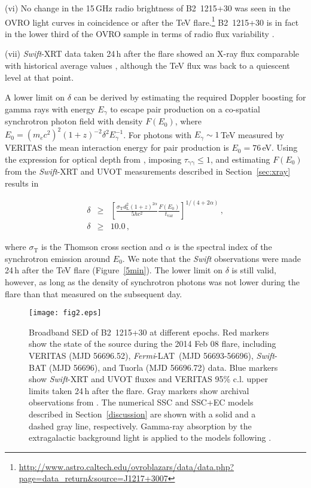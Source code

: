 \documentclass[twocolumn]{aastex6}
\def\b2{B2~1215+30}
\def\lat{\textit{Fermi}-LAT}
\begin{document}
(vi) No change in the 15\,GHz radio brightness of \b2 was seen in the OVRO light curves in coincidence or after the TeV flare.\footnote{ \url{http://www.astro.caltech.edu/ovroblazars/data/data.php?page=data\_return\&source=J1217+3007}} \b2 is in fact in the lower third of the OVRO sample in terms of radio flux variability \citep{2014MNRAS.438.3058R}. 

(vii) {\it Swift}-XRT data taken 24\,h after the flare showed an X-ray flux comparable with historical average values \citep{magic_1215,veritas_1215}, although the TeV flux was back to a quiescent level at that point.

A lower limit on $\delta$ can be derived by estimating the required Doppler boosting for gamma rays with energy $E_\gamma$ to escape pair production on a co-spatial synchrotron photon field with density $F\left(E_0\right)$, where $E_0 = \left(m_e c^2\right)^2 \left(1+z \right)^{-2} \delta^2  E_\gamma^{-1}$.
For photons with $E_\gamma \sim 1$\,TeV measured by VERITAS the mean interaction energy for pair production is $E_0=76$\,eV.
Using the expression for optical depth from \citet{dondi95}, imposing $\tau_{\mathrm{\gamma\gamma}}\leq 1$, and estimating $F\left(E_0\right)$ from the {\it Swift}-XRT and UVOT measurements described in Section~\ref{sec:xray}
results in
\begin{linenomath}
\begin{eqnarray}
\delta & \geq & \left[ \frac{\sigma_\mathrm{T}d^2_\mathrm{L}\left(1+z\right)^{2\alpha}}{5hc^2} \frac{F\left(E_0\right)}{t_\mathrm{var}}\right]^{1/\left(4+2\alpha\right)}\,, \nonumber \\
\delta & \geq & 10.0\, ,
\label{delta}
\end{eqnarray}
\end{linenomath}
where $\sigma_\mathrm{T}$ is the Thomson cross section and $\alpha$ is the spectral index of the synchrotron emission around $E_0$. 
We note that the {\it Swift} observations 
were made 24\,h after the TeV flare (Figure~\ref{5min}). The lower limit on $\delta$ is still valid, however, as long as the density of synchrotron photons was not lower during the flare than that measured on the subsequent day.

\begin{figure}
\centering
\texttt{[image: fig2.eps]}
\caption{Broadband SED of \b2 at different epochs. Red markers show the state of the source during the 2014 Feb 08 flare, including VERITAS (MJD 56696.52), \lat\ (MJD 56693-56696), {\it Swift}-BAT (MJD 56696), and Tuorla (MJD 56696.72) data. 
Blue markers show {\it Swift}-XRT and UVOT fluxes and VERITAS 95\% c.l. upper limits taken 24\,h after the flare. Gray markers show archival observations from \citet{veritas_1215}. The numerical SSC and SSC+EC models described in Section~\ref{discussion} are shown with a solid and a dashed gray line, respectively. Gamma-ray absorption by the extragalactic background light is applied to the models following \citet{ebl}.}
\label{sed}
\end{figure} 
\end{document}

